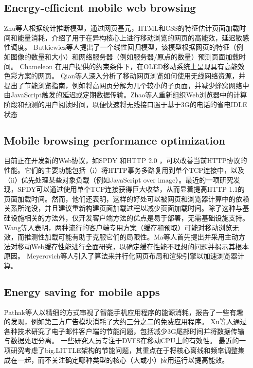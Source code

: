\documentclass{sig-alternate-05-2015}
\begin{document}
\subsection{Energy-efficient mobile web browsing}

Zhu等人\cite{14}根据统计推断模型，通过网页基元，HTML和CSS的特征估计页面加载时间和能量消耗，介绍了用于在异构核心上进行移动浏览的网页的高能效，延迟敏感性调度。 Butkiewicz等人\cite{15}提出了一个线性回归模型，该模型根据网页的特征（例如图像的数量和大小）和网络服务器（例如服务器/原点的数量）预测页面加载时间。 Chameleon \cite{16}\cite{17}在用户提供的约束条件下，在OLED移动系统上呈现具有高能效色彩方案的网页。 Qian等人\cite{18}深入分析了移动网页浏览如何使用无线网络资源，并提出了节能浏览指南，例如将高网页分解为几个较小的子页面，并减少蜂窝网络中由JavaScript触发的延迟或定期数据传输。Zhao等人\cite{19}重新组织Web浏览器中的计算阶段和预测的用户阅读时间，以便快速将无线接口置于基于3G的电话的省电IDLE状态

\subsection{Mobile browsing performance optimization}

目前正在开发新的Web协议，如SPDY \cite{20}和HTTP 2.0 \cite{21}，可以改善当前HTTP协议的性能。它们的主要功能包括（i）将HTTP事务多路复用到单个TCP连接中，以及（ii）优先处理某些对象负载（例如JavaScript over image）。最近的一项研究\cite{22}发现，SPDY可以通过使用单个TCP连接获得巨大收益，从而显着提高HTTP 1.1的页面加载时间。然而，他们还表明，这样的好处可以被网页和浏览器计算中的依赖关系所淹没，并且建议重新构建页面加载过程以减少页面加载时间。除了这种与基础设施相关的方法外，仅开发客户端方法的优点是易于部署，无需基础设施支持。 Wang等人\cite{23}表明，两种流行的客户端专用方案（缓存和预取）可能对移动浏览无效，而推测性加载可能有助于克服它们的局限性。Ma等人\cite{24}首先提出并采用主动方法对移动Web缓存性能进行全面研究，以确定缓存性能不理想的问题并揭示其根本原因。 Meyerovich等人\cite{25}引入了算法来并行化网页布局和渲染引擎以加速浏览器计算。

\subsection{Energy saving for mobile apps}

Pathak等人\cite{26}以精细的方式审视了智能手机应用程序的能源消耗，报告了一些有趣的发现，例如第三方广告模块消耗了大约三分之二的免费应用程序。 Xu等人\cite{27}通过各种技术研究了电子邮件客户端的节能问题，包括减少3G尾部时间并将数据传输与数据处理分离。 一些研究人员专注于DVFS在移动CPU上的有效性。 最近的一项研究\cite{28}考虑了big.LITTLE架构的节能问题，其重点在于将核心离线和频率调整集成在一起，而不关注确定哪种类型的核心（大或小）应用运行以提高能效。
\end{document}
